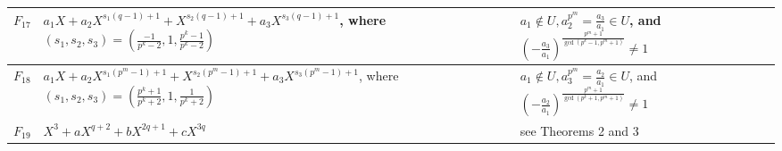 \documentclass[12pt]{amsart}
\numberwithin{equation}{section}
\theoremstyle{definition}
\begin{document}
\begin{longtable}{|m{2em}|m{17em}|m{11em}|m{4em}|}
$F_{17}$& $a_1X+a_2X^{s_1(q-1)+1}+X^{s_2(q-1)+1}+a_3X^{s_3(q-1)+1}$, where $(s_1,s_2,s_3)=( \frac{-1}{p^k-2},1,\frac{p^k-1}{p^k-2})$& $a_1 \notin U, a_2^{p^m}=\frac{a_3}{a_1}\in U$, and $\left(-\frac{a_3}{a_1}\right)^{\frac{p^{m}+1}{\gcd(p^k-1,p^m+1)}}\neq 1$   & ~\cite{Chen}\\
\hline
$F_{18}$& $a_1X+a_2X^{s_1(p^m-1)+1}+X^{s_2(p^m-1)+1}+a_3X^{s_3(p^m-1)+1}$,   where $(s_1,s_2,s_3)=( \frac{p^k+1}{p^k+2},1,\frac{1}{p^k+2})$& $a_1 \notin U, a_3^{p^m}=\frac{a_2}{a_1}\in U$, and $\left(-\frac{a_2}{a_1}\right)^{\frac{p^{m}+1}{\gcd(p^k+1,p^m+1)}}\neq 1$   & ~\cite{Chen}\\
 \hline
$F_{19}$&   $X^3 + aX^{q+2}+bX^{2q+1}+cX^{3q}$ & see Theorems 2 and 3   & ~\cite{FB_quad_2023}\\
 \hline
\end{longtable}
\end{document}
